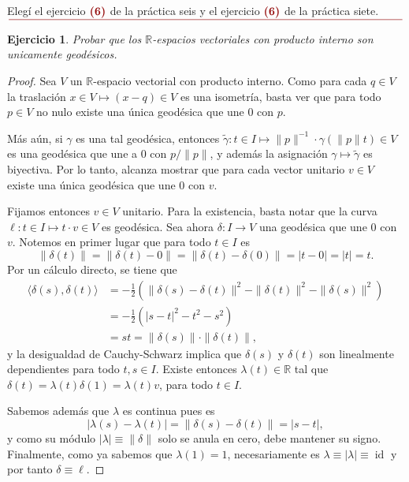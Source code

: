 \documentclass[11pt]{article}
\title{
\LARGE{\paint{Topolog\'ia Algebraica}}
\\
\vspace{5pt}
\small{\paint{Ejercicios para Entregar - Pr\'acticas 6 y 7}}
\\
\vspace{5pt}
\large{\paint{Guido Arnone}}
\\
\paint{
\rule{250pt}{0.5pt}
}
}
\author{}
\date{}
\theoremstyle{colored}
\newtheorem{exercise}{Ejercicio}
\newcommand{\R}{\mathbb{R}}
\newcommand{\id}{\operatorname{id}}
\newcommand{\paint}[1]{\color{color}{#1}}
\newcommand{\tpaint}[1]{\paint{\textbf{#1}}}
\begin{document}
\maketitle

\begin{center}
\paint{\large{Sobre los Ejercicios}}\\
\end{center}

\begin{center}
Elegí el ejercicio $\tpaint{(6)}$ de la práctica seis y el ejercicio $\tpaint{(6)}$ de la práctica siete.
$\paint{
\rule{400pt}{0.5pt}
}$
\vspace{35pt}
\end{center}

\setcounter{exercise}{5}
\begin{exercise} Probar que los $\R$-espacios vectoriales con producto interno son unicamente geodésicos.
\end{exercise}
\begin{proof} Sea $V$ un $\R$-espacio vectorial con producto interno. Como para cada $q \in V$ la traslación $x \in V \mapsto (x - q) \in V$ es una isometría, basta ver que para todo $p \in V$ no nulo existe una única geodésica que une $0$ con $p$. 

Más aún, si $\gamma$ es una tal geodésica, entonces $\tilde{\gamma} : t \in I \mapsto \|p\|^{-1} \cdot \gamma(\|p\|t) \in V$ es una geodésica que une a $0$ con $p/\|p\|$, y además la asignación $\gamma \mapsto \tilde{\gamma}$ es biyectiva. Por lo tanto, alcanza mostrar que para cada vector unitario $v \in V$ existe una única geodésica que une $0$ con $v$. 

Fijamos entonces $v \in V$ unitario. Para la existencia, basta notar que la curva $\ell : t \in I \mapsto t \cdot v \in V$ es geodésica. Sea ahora $\delta: I \to V$ una geodésica que une $0$ con $v$. Notemos en primer lugar que para todo $t \in I$ es 
\[
\|\delta(t)\| = \|\delta(t)-0\| = \|\delta(t)-\delta(0)\| = |t-0| = |t| = t.
\]
Por un cálculo directo, se tiene que
\begin{align*}
\langle \delta(s), \delta(t)\rangle &= -\frac{1}{2}\left(\|\delta(s)-\delta(t)\|^2-\|\delta(t)\|^2-\|\delta(s)\|^2\right)\\
&= -\frac{1}{2}(|s-t|^2-t^2-s^2)\\
&= st = \|\delta(s)\|\cdot\|\delta(t)\|,
\end{align*}
y la desigualdad de Cauchy-Schwarz implica que $\delta(s)$ y $\delta(t)$ son linealmente dependientes para todo $t,s \in I$. Existe entonces $\lambda(t) \in \R$ tal que $\delta(t) = \lambda(t)\delta(1) = \lambda(t)v$, para todo $t \in I$. 

Sabemos además que $\lambda$ es continua pues es \[|\lambda(s)-\lambda(t)| = \|\delta(s)-\delta(t)\| = |s-t|,\]
y como su módulo $|\lambda| \equiv \|\delta\|$ solo se anula en cero, debe mantener su signo. Finalmente, como ya sabemos que $\lambda(1) = 1$, necesariamente es $\lambda \equiv |\lambda| \equiv \id$ y por tanto $\delta \equiv \ell$.
\end{proof}
\end{document}
